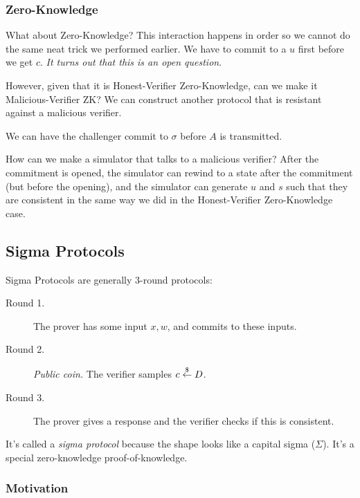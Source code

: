 \subsubsection{Zero-Knowledge}
What about Zero-Knowledge? This interaction happens in order so we cannot do the same neat trick we performed earlier. We have to commit to a $u$ first before we get $c$. \emph{It turns out that this is an open question}.

However, given that it is Honest-Verifier Zero-Knowledge, can we make it Malicious-Verifier ZK? We can construct another protocol that is resistant against a malicious verifier.

We can have the challenger commit to $\sigma$ before $A$ is transmitted.

How can we make a simulator that talks to a malicious verifier? After the commitment is opened, the simulator can rewind to a state after the commitment (but before the opening), and the simulator can generate $u$ and $s$ such that they are consistent in the same way we did in the Honest-Verifier Zero-Knowledge case.


\subsection{Sigma Protocols}
\vspace{1em}
\begin{definition*}
    Sigma Protocols are generally 3-round protocols:
    \begin{description}
        \item[Round 1.] The prover has some input $x, w$, and commits to these inputs.
        \item[Round 2.] \emph{Public coin.} The verifier samples $c\overset{\$}{\leftarrow} D$.
        \item[Round 3.] The prover gives a response and the verifier checks if this is consistent.
    \end{description}
\end{definition*}

It's called a \emph{sigma protocol} because the shape looks like a capital sigma ($\Sigma$). It's a special zero-knowledge proof-of-knowledge.

\subsubsection{Motivation}

